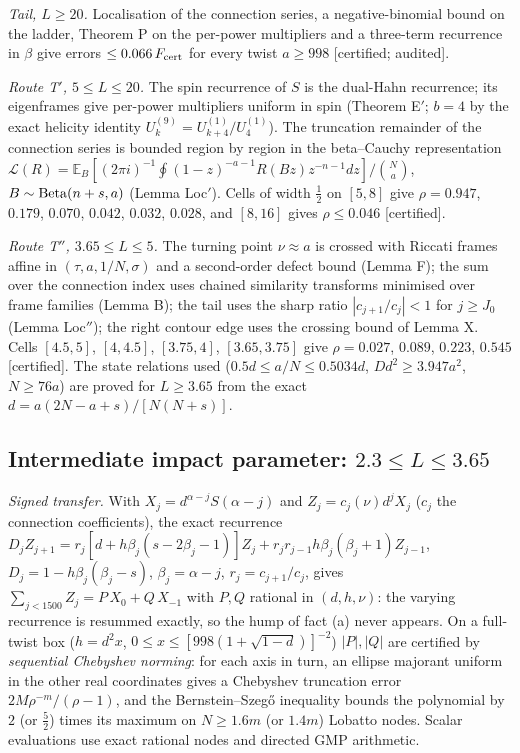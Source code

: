 \emph{Tail, $L\ge20$.} Localisation of the connection series, a negative-binomial bound on the ladder, Theorem P on the per-power
multipliers and a three-term recurrence in $\beta$ give errors $\le0.066\,F_{\rm cert}$ for every twist $a\ge998$ [certified; audited].

\emph{Route T$'$, $5\le L\le20$.} The spin recurrence of $S$ is the dual-Hahn recurrence; its eigenframes give per-power multipliers
uniform in spin (Theorem E$'$; $b=4$ by the exact helicity identity $U^{(9)}_k=U^{(1)}_{k+4}/U^{(1)}_4$). The truncation remainder of the
connection series is bounded region by region in the beta--Cauchy representation $\mathcal L(R)=\mathbb E_B[(2\pi i)^{-1}\oint(1-z)^{-a-1}R(Bz)z^{-n-1}dz]/\binom Na$,
$B\sim{\rm Beta}(n+s,a)$ (Lemma Loc$'$). Cells of width $\frac12$ on $[5,8]$ give $\rho=0.947$, $0.179$, $0.070$, $0.042$, $0.032$,
$0.028$, and $[8,16]$ gives $\rho\le0.046$ [certified].

\emph{Route T$''$, $3.65\le L\le5$.} The turning point $\nu\approx a$ is crossed with Riccati frames affine in $(\tau,a,1/N,\sigma)$ and a
second-order defect bound (Lemma F); the sum over the connection index uses chained similarity transforms minimised over frame families
(Lemma B); the tail uses the sharp ratio $|c_{j+1}/c_j|<1$ for $j\ge J_0$ (Lemma Loc$''$); the right contour edge uses the crossing
bound of Lemma X. Cells $[4.5,5]$, $[4,4.5]$, $[3.75,4]$, $[3.65,3.75]$ give $\rho=0.027$, $0.089$, $0.223$, $0.545$ [certified]. The
state relations used ($0.5d\le a/N\le0.5034d$, $Dd^2\ge3.947a^2$, $N\ge76a$) are proved for $L\ge3.65$ from the exact
$d=a(2N-a+s)/[N(N+s)]$.

\subsection{Intermediate impact parameter: \texorpdfstring{$2.3\le L\le3.65$}{2.3 <= L <= 3.65}}
\emph{Signed transfer.} With $X_j=d^{\alpha-j}S(\alpha-j)$ and $Z_j=c_j(\nu)d^jX_j$ ($c_j$ the connection coefficients), the exact
recurrence $D_jZ_{j+1}=r_j[d+h\beta_j(s-2\beta_j-1)]Z_j+r_jr_{j-1}h\beta_j(\beta_j+1)Z_{j-1}$, $D_j=1-h\beta_j(\beta_j-s)$,
$\beta_j=\alpha-j$, $r_j=c_{j+1}/c_j$, gives $\sum_{j<1500}Z_j=P\,X_0+Q\,X_{-1}$ with $P,Q$ rational in $(d,h,\nu)$: the varying
recurrence is resummed exactly, so the hump of fact (a) never appears. On a full-twist box ($h=d^2x$,
$0\le x\le[998(1+\sqrt{1-d})]^{-2}$) $|P|,|Q|$ are certified by \emph{sequential Chebyshev norming}: for each axis in turn, an
ellipse majorant uniform in the other real coordinates gives a Chebyshev truncation error $2M\rho^{-m}/(\rho-1)$, and the
Bernstein--Szeg\H{o} inequality bounds the polynomial by $2$ (or $\frac52$) times its maximum on $N\ge1.6m$ (or $1.4m$) Lobatto nodes.
Scalar evaluations use exact rational nodes and directed GMP arithmetic.

